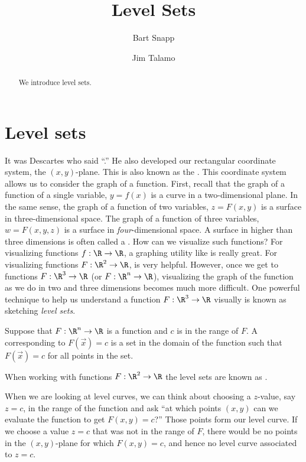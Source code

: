 \documentclass{ximera}
\author{Bart Snapp \and Jim Talamo}
\title[Dig-In:]{Level Sets}
\begin{document}
\begin{abstract}
  We introduce level sets.
\end{abstract}
\maketitle




\section{Level sets}

It was Descartes who said ``.'' He also
developed our rectangular coordinate system, the $(x,y)$-plane. This
is also known as the .
This coordinate system allows us to consider the graph of a
function. First, recall that the graph of a function of a single
variable, $y=f(x)$ is a curve in a two-dimensional plane.  In the same
sense, the graph of a function of two variables, $z = F(x,y)$ is a
surface in three-dimensional space. The graph of a function of three
variables, $w=F(x,y,z)$ is a surface in \textit{four}-dimensional
space. A surface in higher than three dimensions is often called a
. How can we visualize such functions?  For
visualizing functions $f:\R\to\R$, a graphing utility like
 is really great. For
visualizing functions $F:\R^2\to\R$,
 is very
helpful. However, once we get to functions $F:\R^3\to\R$ (or $F: \R^n \to \R$), visualizing 
the graph of the function as we do in two and three dimensions 
becomes much more difficult.  One
powerful technique to help us understand a function $F:\R^3\to\R$
visually is known as sketching \textit{level sets}.


\begin{definition}
  Suppose that $F:\R^n \to \R$ is a function and $c$ is in the range
  of $F$. A  corresponding to $F(\vec{x})=c$ is a set
  in the domain of the function such that $F(\vec{x}) = c$ for all
  points in the set.
\end{definition}

When working with functions $F:\R^2\to\R$ the level sets are known as
.

When we are looking at level curves, we can think about choosing
a $z$-value, say $z=c$, in the range of the function and ask ``at
which points $(x,y)$ can we evaluate the function to get $F(x,y)=c$?''
Those points form our level curve.    If we choose a value $z=c$ 
that was not in the range of $F$, there would be no points in the 
$(x,y)$-plane for which $F(x,y)=c$, and hence no level curve 
associated to $z = c$.
\end{document}
